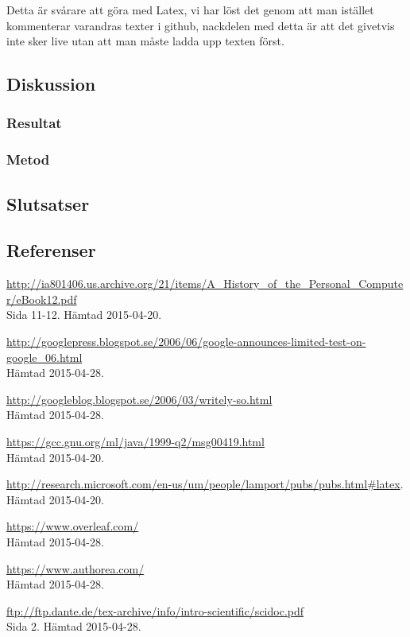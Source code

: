 Detta är svårare att göra med Latex, vi har löst det genom att man istället kommenterar varandras texter i github, nackdelen med detta är att det givetvis inte sker live utan att man måste ladda upp texten först.

\subsection{Diskussion}
\subsubsection{Resultat}
\subsubsection{Metod}
\subsection{Slutsatser}
\subsection{Referenser}
\vspace{-9mm}
\renewcommand{\refname}{}
\begin{thebibliography}{9}
\footnotesize
{}
\url{http://ia801406.us.archive.org/21/items/A_History_of_the_Personal_Computer/eBook12.pdf}\\
 Sida 11-12. Hämtad 2015-04-20.

\url{http://googlepress.blogspot.se/2006/06/google-announces-limited-test-on-google_06.html}\\
 Hämtad 2015-04-28.

\url{http://googleblog.blogspot.se/2006/03/writely-so.html}\\
 Hämtad 2015-04-28. 

\url{https://gcc.gnu.org/ml/java/1999-q2/msg00419.html}\\
 Hämtad 2015-04-20.

\url{http://research.microsoft.com/en-us/um/people/lamport/pubs/pubs.html#latex}.\\
 Hämtad 2015-04-20.
 
\url{https://www.overleaf.com/}\\
 Hämtad 2015-04-28.

\url{https://www.authorea.com/}\\
 Hämtad 2015-04-28.
 
\url{ftp://ftp.dante.de/tex-archive/info/intro-scientific/scidoc.pdf}\\
Sida 2. Hämtad 2015-04-28.

\end{thebibliography}

